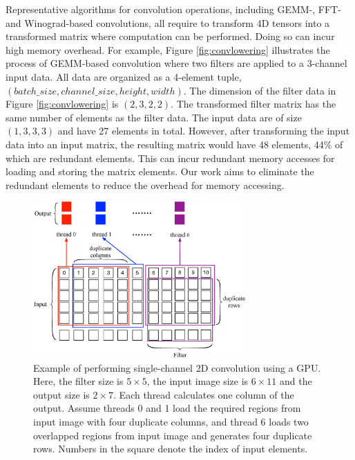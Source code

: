 Representative algorithms for convolution operations, including GEMM-, FFT- and Winograd-based convolutions, all require to transform 4D
tensors into a transformed matrix where computation can be performed. Doing so can incur high memory overhead. For example, Figure
\ref{fig:convlowering} illustrates the process of GEMM-based convolution where two filters are applied to a 3-channel input data. All data
are organized as a 4-element tuple, $(batch\_size, channel\_size, height, width)$. The dimension of the filter data in Figure
\ref{fig:convlowering} is $(2, 3, 2, 2)$. The transformed filter matrix has the same number of elements as the filter data. The input data
are of size $(1, 3, 3, 3)$ and have 27 elements in total. However, after transforming the input data into an input matrix, the resulting
matrix would have 48 elements, 44\% of which are redundant elements. This can incur redundant memory accesses for loading and storing the
matrix elements. Our work aims to eliminate the redundant elements to reduce the overhead for memory accessing. 



\begin{figure}[t!]
\centering
  \includegraphics[width=\columnwidth,height=6cm]{./figure/twostrategies.eps}
  \caption{Example of performing single-channel 2D convolution using a GPU. Here, the filter size is $5 \times 5$, the input image size is $6 \times 11$
  and the output size is $2 \times 7$. Each thread calculates one column of the output. Assume threads 0 and 1 load the required regions from input
  image with four duplicate columns, and thread 6 loads two overlapped regions from input image and generates four duplicate rows. Numbers in
  the square denote the index of input elements.}
  \label{fig:twostrategies}
\end{figure}
